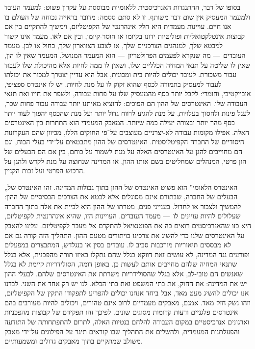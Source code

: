 בסופו של דבר, ההתנגדות האנרכיסטית ללאומיות מבוססת על עקרון פשוט: למעמד העובד ולמעמד המעסיק אין שום דבר משותף. זו לא סתם ססמה: מדובר בראייה נכוחה של העולם בו אנו חיים. עויינות מעמדית היא חלק אינהרנטי של הקפיטליזם, וימשיך להתקיים בין אם קבוצות אינטלקטואליות ופוליטיות ידונו בקיומו או חוסר-קיומו, ובין אם לאו. מעמד אינו קשור למבטא שלך, למנהגים הצרכניים שלך, או לצבע הצווארון שלך, כחול או לבן. מעמד העובדים~— מה שנקרא לפעמים הפרולטריון~— הוא המעמד המנושל, המעמד שאין לו הון, שאין לו שליטה על תנאי המחיה הכלליים שלו, ושאין לו ממה לחיות אלא מהיכולת שלו לעבוד עבור משכורת. לעובד יכולים להיות בית ומכונית, אבל הוא עדיין יצטרך למכור את יכולתו לעבוד למעסיק בתמורה לכסף שהוא זקוק לו על מנת לחיות. יש לו אינטרס ספציפי, אובייקטיבי, וחומרי: לקבל יותר כסף מהמעסיק שלו על פחות עבודה, ולשפר את חייו ואת תנאי העבודה שלו. האינטרסים של ההון הם הפוכים: להוציא מאיתנו יותר עבודה עבור פחות שכר, לעגל פינות ולחסוך בעלויות, על מנת להגיע לרווח גדול יותר ועל מנת שהכסף יהפוך לעוד יותר כסף מהר יותר ובצורה יעילה כמה שיותר. המאבק המעמדי הוא התחרות בין האינטרסים האלה. אפילו מקומות עבודה לא-יצרניים מעוצבים על־פי החוקים הללו, מכיוון שהם העקרונות היסודיים של החברה הקפיטליסטית. האינטרסים של ההון מתבטאים על־ידי בעלי הכוח, וגם הם מחוייבים להגן על האינטרסים האלה על מנת לשמור על כוחם, בין אם הם הבעלים של הון פרטי, המנהלים שמחליטים בשם אותו ההון, או המדינה שנחוצה על מנת לקדש ולהגן על הרכוש הפרטי ועל זכות הקניין.

„האינטרס הלאומי” הוא פשוט האינטרס של ההון בתוך גבולות המדינה. זהו האינטרס של הבעלים של החברה, שבתורם אינם מסוגלים אלא לבטא את הצרכים הבסיסיים של ההון: להמשיך ולצבור או לחדול. בענייני פנים, מטרתו של ההון היא לביית את אלה בתוך החברה שעלולים להיות עויינים לו~— מעמד העובדים. העויינות הזו, שהיא אינהרנטית לקפיטליזם, היא כזו שהאנרכיסטים רואים בה את הפוטנציאל להתקדם אל מעבר לקפיטליזם. עלינו להאבק על האינטרסים שלנו כדי להשיג את צרכינו כויתורים מטעם ההון. התהליך הזה קורה גם אם לא מבססים תיאוריות מורכבות סביב לו. עובדים בסין או בנגלדש, המתבצרים במפעלים ופורעים נגד המדינה, לא עושים זאת דווקא בגלל שהם נתקלו באיזו תורה מהפכנית, אלא בגלל שתנאי המחיה שלהם מחייבים אותם לעשות כן. באופן דומה, הסולידריות קיימת לא בגלל שאנשים הם טובי-לב, אלא בגלל שהסולידריות משרתת את האינטרסים שלהם. לבעלי ההון יש את המדינה: את החוק, את בתי המשפט ואת בתי־הכלא. לנו יש רק אחד את השני. לבדנו אנו יכולים להשיג מעט מאד, אבל ביחד אנחנו יכולים להפריע לתפקודו התקין של הקפיטליזם, וזהו נשק חזק מאד. אמנם, מאבקים מעמדיים לרוב אינם טהורים, ויכולים להיות מעורבים בהם אינטרסים פלגניים ודעות קדומות מסוגים שונים. לפיכך זהו תפקידם של קבוצות מהפכניות וארגונים אנרכיסטיים במקום העבודה להלחם בנטיות האלה, לתרום להתפתחותה של התודעה והפעלתנות המעמדית, ולהשלים את התהליך שבו קוראים תיגר על הפילוגים על־ידי מאבק משולב שמתקיים בתוך מאבקים גדולים ומשמעותיים.

